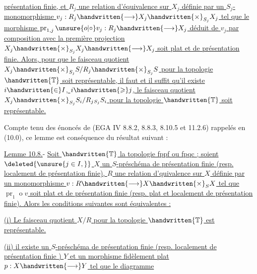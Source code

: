 \uline{présentation finie, et $R_j$ une relation d'équivalence sur $X_j$ définie par un $S_j$-monomorphisme $v_j:R_j\handwritten{\longrightarrow}X_j\handwritten{\times}_{S_j}X_j$ tel que le morphisme $\operatorname{pr}_{1,j}\mathbin{\unsure{o|\circ}} v_j:R_j\handwritten{\longrightarrow}X_j$ déduit de $v_j$ par composition avec la première projection $X_j\handwritten{\times}_{S_j}X_j\handwritten{\longrightarrow}X_j$ soit plat et de présentation finie. Alors, pour que le faisceau quotient $X_j\handwritten{\times}_{S_j}S/R_j\handwritten{\times}_{S_j}S$ pour la topologie $\handwritten{\mathbb{T}}$ soit représentable, il faut et il suffit qu'il existe $i\handwritten{\in}I$, $i\handwritten{\geqslant}j$, le faisceau quotient $X_j\handwritten{\times}_{S_j}S_i/R_j{}_{S_j}S_i$ pour la topologie $\handwritten{\mathbb{T}}$ soit représentable.}

Compte tenu des énoncés de (EGA IV 8.8.2, 8.8.3, 8.10.5 et 11.2.6) rappelés en (10.0), ce lemme est conséquence du résultat suivant :

\uline{Lemme 10.8.}- \uline{Soit $\handwritten{\mathbb{T}}$ la topologie fppf ou fpqc ; soient $\deleted{\unsure{j\in I,}}$ $X$ un $S$-préschéma de présentation finie (resp. localement de présentation finie), $R$ une relation d'quivalence sur $X$ définie par un monomorphisme $v:R\handwritten{\longrightarrow}X\handwritten{\times}_S X$ tel que $\operatorname{pr}_1\mathbin{o} v$ soit plat et de présentation finie (resp. plat et localement de présentation finie). Alors les conditions suivantes sont équivalentes :}

\uline{(i) Le faisceau quotient $X/R$ pour la topologie $\handwritten{\mathbb{T}}$ est représentable.}

\uline{(ii) il existe un $S$-préschéma de présentation finie (resp. localement de présentation finie ) $Y$ et un morphisme fidèlement plat $p:X\handwritten{\longrightarrow}Y$ tel que le diagramme}


